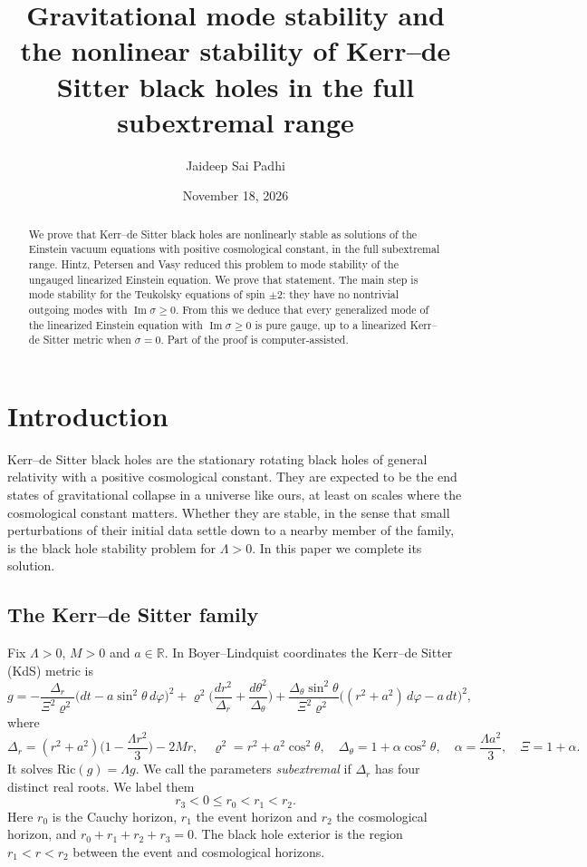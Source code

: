 \documentclass[11pt]{amsart}
\title[Stability of Kerr--de Sitter black holes]{Gravitational mode stability and the nonlinear stability of Kerr--de Sitter black holes in the full subextremal range}
\author{Jaideep Sai Padhi}
\date{November 18, 2026}
\theoremstyle{definition}
\theoremstyle{remark}
\numberwithin{equation}{section}
\newcommand{\R}{\mathbb{R}}
\renewcommand{\Im}{\operatorname{Im}}
\begin{document}
\begin{abstract}
We prove that Kerr--de Sitter black holes are nonlinearly stable as solutions of the Einstein vacuum equations with
positive cosmological constant, in the full subextremal range. Hintz, Petersen and Vasy reduced this problem to mode
stability of the ungauged linearized Einstein equation. We prove that statement. The main step is mode stability for
the Teukolsky equations of spin $\pm2$: they have no nontrivial outgoing modes with $\Im\sigma\ge0$. From this we
deduce that every generalized mode of the linearized Einstein equation with $\Im\sigma\ge0$ is pure gauge, up to a
linearized Kerr--de Sitter metric when $\sigma=0$. Part of the proof is computer-assisted.
\end{abstract}

\maketitle

\section{Introduction}\label{sec:intro}

Kerr--de Sitter black holes are the stationary rotating black holes of general relativity with a positive
cosmological constant. They are expected to be the end states of gravitational collapse in a universe like ours, at
least on scales where the cosmological constant matters. Whether they are stable, in the sense that small
perturbations of their initial data settle down to a nearby member of the family, is the black hole stability
problem for $\Lambda>0$. In this paper we complete its solution.

\subsection{The Kerr--de Sitter family}
Fix $\Lambda>0$, $M>0$ and $a\in\R$. In Boyer--Lindquist coordinates the Kerr--de Sitter (KdS) metric is
\begin{equation}\label{eq:kds}
g=-\frac{\Delta_r}{\Xi^2\varrho^2}\big(dt-a\sin^2\theta\,d\varphi\big)^2+\varrho^2\Big(\frac{dr^2}{\Delta_r}+\frac{d\theta^2}{\Delta_\theta}\Big)
+\frac{\Delta_\theta\sin^2\theta}{\Xi^2\varrho^2}\big((r^2+a^2)\,d\varphi-a\,dt\big)^2,
\end{equation}
where
\[
\Delta_r=(r^2+a^2)\Big(1-\frac{\Lambda r^2}{3}\Big)-2Mr,\quad \varrho^2=r^2+a^2\cos^2\theta,\quad
\Delta_\theta=1+\alpha\cos^2\theta,\quad \alpha=\frac{\Lambda a^2}{3},\quad \Xi=1+\alpha.
\]
It solves $\mathrm{Ric}(g)=\Lambda g$. We call the parameters \emph{subextremal} if $\Delta_r$ has four distinct real
roots. We label them
\[
r_3<0\le r_0<r_1<r_2 .
\]
Here $r_0$ is the Cauchy horizon, $r_1$ the event horizon and $r_2$ the cosmological horizon, and
$r_0+r_1+r_2+r_3=0$. The black hole exterior is the region $r_1<r<r_2$ between the event and cosmological horizons.
\end{document}
